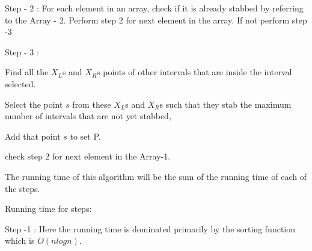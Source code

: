 \documentclass[letterpaper,portrait,12pt]{article}
\begin{document}
\begin{flushleft}

\end{flushleft}


\begin{flushleft}
Step - 2 : For each element in an array, check if it is already stabbed by referring to the Array - 2. Perform step 2 for next element in the array. If not perform step -3
\end{flushleft}


\begin{flushleft}

\end{flushleft}


\begin{flushleft}
Step - 3 : 
\end{flushleft}


\begin{flushleft}
	Find all the $X_L$s and $X_R$s points of other intervals that are inside the interval selected.
\end{flushleft}


\begin{flushleft}
	Select the point $s$ from these $X_L $s and $X_R$s such that they stab the maximum number of intervals that are not yet stabbed, 
\end{flushleft}


\begin{flushleft}
	Add that point $s$ to set P.
\end{flushleft}


\begin{flushleft}
	check step 2 for next element in the Array-1.
\end{flushleft}


\begin{flushleft}

\end{flushleft}


\begin{flushleft}
The running time of this algorithm will be the sum of the running time of each of the steps.
\end{flushleft}


\begin{flushleft}
Running time for steps:
\end{flushleft}


\begin{flushleft}
Step -1  : Here the running time is dominated primarily by the sorting function which is $O(nlogn)$.
\end{flushleft}
\end{document}
